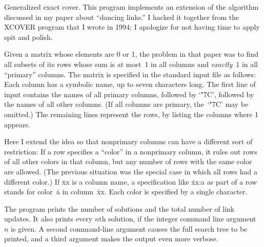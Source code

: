 
\hypertextrue\srcloctrue
\datethis

Generalized exact cover.
This program implements an extension of
the algorithm discussed in my paper about ``dancing
links.'' I hacked it together from the {\mc XCOVER} program that I wrote in
1994; I apologize for not having time to apply spit and polish.

Given a matrix whose elements are 0 or 1, the problem in that paper was to
find all subsets of its rows whose sum is at most~1 in all columns and
{\it exactly\/}~1 in all ``primary'' columns. The matrix is specified
in the standard input file as follows: Each column has a symbolic name,
up to seven characters long. The first line of input contains
the names of all primary columns, followed by `\.{\char"7C}', followed by
the names of all other columns.
(If all columns are primary, the~`\.{\char"7C}' may be omitted.)
The remaining lines represent the rows, by listing the columns where 1 appears.

Here I extend the idea so that nonprimary columns can have a different sort
of restriction: If a row specifies a ``color'' in a nonprimary column,
it rules out rows of all other colors in that column,
but any number of rows with the
same color are allowed. (The previous situation was the special case
in which all rows had a different color.)
If \.{xx} is a column name, a specification like \.{xx:a} as part of a row
stands for color~\.a in column~\.{xx}. Each color is specified by a
single character.

The program prints the number of solutions and the total number of link
updates. It also prints every $n$th solution, if the integer command
line argument $n$ is given. A second command-line argument causes the
full search tree to be printed, and a third argument makes the output
even more verbose.

